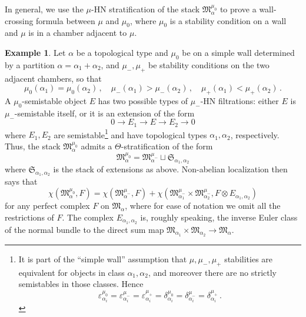 \documentclass[12pt]{amsart}
\theoremstyle{definition}
\newtheorem{example}[definition]{Example}
\newcommand{\1}{\mathbf 1}
\newcommand{\FM}{{\mathfrak{M}}}
\newcommand{\FS}{{\mathfrak{S}}}
\begin{document}
In general, we use the $\mu$-HN stratification of the stack $\FM_\alpha^{\mu_0}$ to prove a wall-crossing formula between $\mu$ and $\mu_0$, where $\mu_0$ is a stability condition on a wall and $\mu$ is in a chamber adjacent to $\mu$. 

\begin{example}
Let $\alpha$ be a topological type and $\mu_0$ be on a simple wall determined by a partition $\alpha=\alpha_1+\alpha_2$, and $\mu_-, \mu_+$ be stability conditions on the two adjacent chambers, so that
\[\mu_0(\alpha_1)=\mu_0(\alpha_2)\,,\quad  \mu_-(\alpha_1)>\mu_-(\alpha_2)\,,\quad \mu_+(\alpha_1)<\mu_+(\alpha_2)\,.\]
A $\mu_0$-semistable object $E$ has two possible types of $\mu_-$-HN filtrations: either $E$ is $\mu_-$-semistable itself, or it is an extension of the form
\[0\to E_1\to E\to E_2\to 0\]
where $E_1, E_2$ are semistable\footnote{It is part of the ``simple wall'' assumption that $\mu, \mu_-, \mu_+$ stabilities are equivalent for objects in class $\alpha_1, \alpha_2$, and moreover there are no strictly semistables in those classes. Hence \[\varepsilon_{\alpha_i}^{\mu_0}=\varepsilon_{\alpha_i}^{\mu_-}=\varepsilon_{\alpha_i}^{\mu_+}=\delta_{\alpha_i}^{\mu_0}=\delta_{\alpha_i}^{\mu_-}=\delta_{\alpha_i}^{\mu_+}\,.\]} and have topological types $\alpha_1, \alpha_2$, respectively. Thus, the stack $\FM^{\mu_0}_\alpha$ admits a $\Theta$-stratification of the form 
\[\FM^{\mu_0}_\alpha=\FM^{\mu_-}_\alpha\sqcup \FS_{\alpha_1, \alpha_2}\]
where $\FS_{\alpha_1, \alpha_2}$ is the stack of extensions as above. Non-abelian localization then says that
\[\chi(\FM^{\mu_0}_\alpha, F)=\chi(\FM^{\mu_-}_\alpha, F)+\chi(\FM^{\mu_-}_{\alpha_1}\times \FM^{\mu_-}_{\alpha_2}, F\otimes E_{\alpha_1, \alpha_2})\]
for any perfect complex $F$ on $\FM_\alpha$, where for ease of notation we omit all the restrictions of $F$. The complex $E_{\alpha_1, \alpha_2}$ is, roughly speaking, the inverse Euler class of the normal bundle to the direct sum map $\FM_{\alpha_1}\times \FM_{\alpha_2}\to \FM_\alpha$. 


\end{example}
\end{document}

